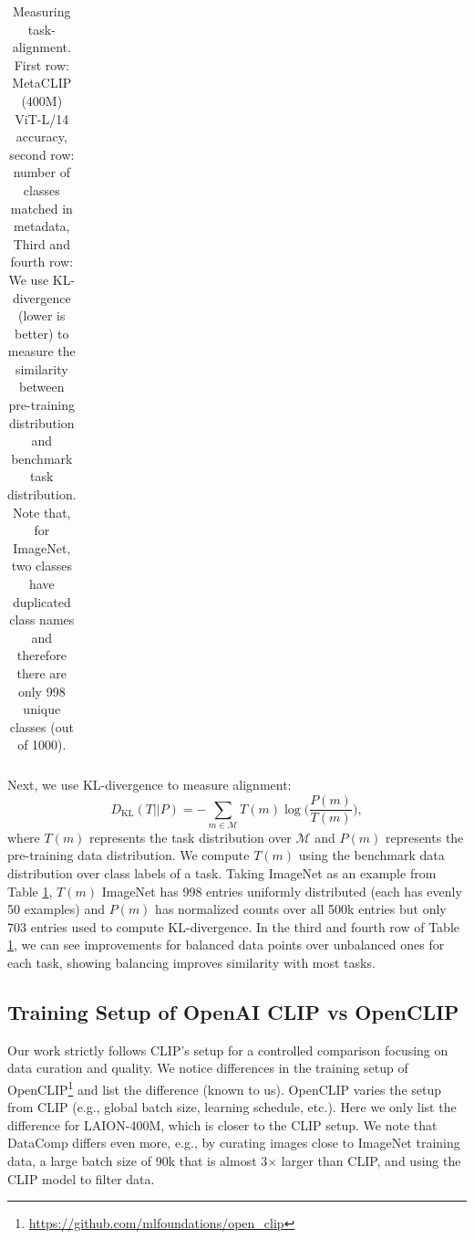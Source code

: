 \documentclass{article} %
\begin{document}
{\begin{table}[!htp]
{\begin{tabular}{l | c c c c c c c c c c c c c c c c c c c c c c c c c c c}
\hline
\end{tabular}
}
    \caption{{\color{black}Measuring task-alignment. First row: MetaCLIP (400M) ViT-L/14 accuracy, second row: number of classes matched in metadata, Third and fourth row: We use KL-divergence (lower is better) to measure the similarity between pre-training distribution and benchmark task distribution. Note that, for ImageNet, two classes have duplicated class names and therefore there are only 998 unique classes (out of 1000).}}
\vspace{10pt}
\label{tbl:task_agnosity}
\end{table}

Next, we use KL-divergence to measure alignment:
\begin{equation}
D_\text{KL}(T||P) = -\sum_{m\in\mathcal{M}}T(m)\log\big(\frac{P(m)}{T(m)}\big),
\end{equation}
where $T(m)$ represents the task distribution over $\mathcal{M}$ and $P(m)$ represents the pre-training data distribution. We compute $T(m)$ using the benchmark data distribution over class labels of a task. 
Taking ImageNet as an example from Table \ref{tbl:task_agnosity}, $T(m)$ ImageNet has 998 entries uniformly distributed (each has evenly 50 examples) and $P(m)$ has normalized counts over all 500k entries but only 703 entries used to compute KL-divergence.
In the third and fourth row of Table \ref{tbl:task_agnosity}, we can see improvements for balanced data points over unbalanced ones for each task, showing balancing improves similarity with most tasks.

}

\subsection{Training Setup of OpenAI CLIP vs OpenCLIP}
\label{sec:openclip}
Our work strictly follows CLIP's setup for a controlled comparison focusing on data curation and quality. We notice differences in the training setup of OpenCLIP\footnote{\url{https://github.com/mlfoundations/open_clip}} and list the difference (known to us). OpenCLIP varies the setup from CLIP (e.g., global batch size, learning schedule, etc.). Here we only list the difference for LAION-400M\citep{schuhmann2021laion}, which is closer to the CLIP setup. We note that DataComp differs even more, e.g., by curating images close to ImageNet training data, a large batch size of 90k that is almost 3$\times$ larger than CLIP, and using the CLIP model to filter data.
\end{document}
